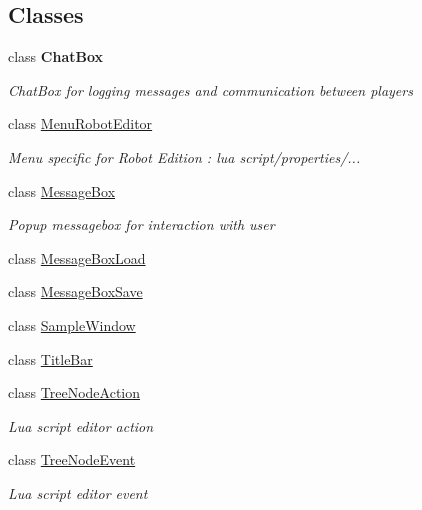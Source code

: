 \subsection*{Classes}
\begin{DoxyCompactItemize}
\item 
class {\bfseries Chat\+Box}
\begin{DoxyCompactList}\small\item\em Chat\+Box for logging messages and communication between players \end{DoxyCompactList}\item 
class \hyperlink{classgearit_1_1src_1_1_g_u_i_1_1_menu_robot_editor}{Menu\+Robot\+Editor}
\begin{DoxyCompactList}\small\item\em Menu specific for Robot Edition \+: lua script/properties/... \end{DoxyCompactList}\item 
class \hyperlink{classgearit_1_1src_1_1_g_u_i_1_1_message_box}{Message\+Box}
\begin{DoxyCompactList}\small\item\em Popup messagebox for interaction with user \end{DoxyCompactList}\item 
class \hyperlink{classgearit_1_1src_1_1_g_u_i_1_1_message_box_load}{Message\+Box\+Load}
\item 
class \hyperlink{classgearit_1_1src_1_1_g_u_i_1_1_message_box_save}{Message\+Box\+Save}
\item 
class \hyperlink{classgearit_1_1src_1_1_g_u_i_1_1_sample_window}{Sample\+Window}
\item 
class \hyperlink{classgearit_1_1src_1_1_g_u_i_1_1_title_bar}{Title\+Bar}
\item 
class \hyperlink{classgearit_1_1src_1_1_g_u_i_1_1_tree_node_action}{Tree\+Node\+Action}
\begin{DoxyCompactList}\small\item\em Lua script editor action \end{DoxyCompactList}\item 
class \hyperlink{classgearit_1_1src_1_1_g_u_i_1_1_tree_node_event}{Tree\+Node\+Event}
\begin{DoxyCompactList}\small\item\em Lua script editor event \end{DoxyCompactList}\end{DoxyCompactItemize}
